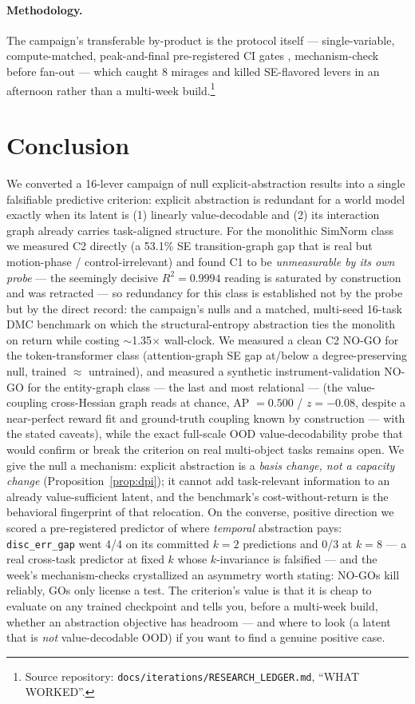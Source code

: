 \documentclass{article}
\begin{document}
\paragraph{Methodology.} The campaign's transferable by-product is the protocol itself --- single-variable, compute-matched, peak-and-final pre-registered CI gates \citep{agarwal2021rliable}, mechanism-check before fan-out --- which caught 8 mirages and killed SE-flavored levers in an afternoon rather than a multi-week build.\footnote{Source repository: \texttt{docs/iterations/RESEARCH\_LEDGER.md}, ``WHAT WORKED''.}

\section{Conclusion}
\label{sec:conclusion}

We converted a 16-lever campaign of null explicit-abstraction results into a single falsifiable predictive criterion: explicit abstraction is redundant for a world model exactly when its latent is (1) linearly value-decodable and (2) its interaction graph already carries task-aligned structure. For the monolithic SimNorm class we measured C2 directly (a 53.1\% SE transition-graph gap that is real but motion-phase / control-irrelevant) and found C1 to be \emph{unmeasurable by its own probe} --- the seemingly decisive $R^2=0.9994$ reading is saturated by construction and was retracted --- so redundancy for this class is established not by the probe but by the direct record: the campaign's nulls and a matched, multi-seed 16-task DMC benchmark on which the structural-entropy abstraction ties the monolith on return while costing $\sim$1.35$\times$ wall-clock. We measured a clean C2 NO-GO for the token-transformer class (attention-graph SE gap at/below a degree-preserving null, trained $\approx$ untrained), and measured a synthetic instrument-validation NO-GO for the entity-graph class --- the last and most relational --- (the value-coupling cross-Hessian graph reads at chance, AP $=0.500$ / $z=-0.08$, despite a near-perfect reward fit and ground-truth coupling known by construction --- with the stated caveats), while the exact full-scale OOD value-decodability probe that would confirm or break the criterion on real multi-object tasks remains open. We give the null a mechanism: explicit abstraction is a \emph{basis change, not a capacity change} (Proposition~\ref{prop:dpi}); it cannot add task-relevant information to an already value-sufficient latent, and the benchmark's cost-without-return is the behavioral fingerprint of that relocation. On the converse, positive direction we scored a pre-registered predictor of where \emph{temporal} abstraction pays: \texttt{disc\_err\_gap} went 4/4 on its committed $k{=}2$ predictions and 0/3 at $k{=}8$ --- a real cross-task predictor at fixed $k$ whose $k$-invariance is falsified --- and the week's mechanism-checks crystallized an asymmetry worth stating: NO-GOs kill reliably, GOs only license a test. The criterion's value is that it is cheap to evaluate on any trained checkpoint and tells you, before a multi-week build, whether an abstraction objective has headroom --- and where to look (a latent that is \emph{not} value-decodable OOD) if you want to find a genuine positive case.



\end{document}
